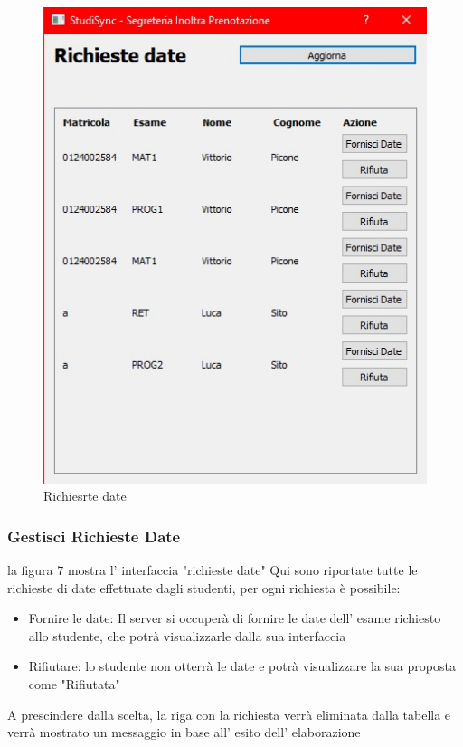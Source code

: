 \documentclass{article}
\begin{document}
\begin{figure}
    \centering
    \includegraphics[width=1\linewidth]{IMG/richiesteDate.jpg}
    \caption{Richiesrte date}
    \label{fig:enter-label}
\end{figure}
\subsubsection{Gestisci Richieste Date}
la figura 7 mostra l' interfaccia "richieste date" Qui sono riportate tutte le richieste di date effettuate dagli studenti, per ogni richiesta è possibile:
\begin{itemize}
    \item Fornire le date: Il server si occuperà di fornire le date dell' esame richiesto allo studente, che potrà visualizzarle dalla sua interfaccia
    \item Rifiutare: lo studente non otterrà le date e potrà visualizzare la sua proposta come "Rifiutata"
\end{itemize}

A prescindere dalla scelta, la riga con la richiesta verrà eliminata dalla tabella e verrà mostrato un messaggio in base all' esito dell' elaborazione
\newpage
\end{document}
